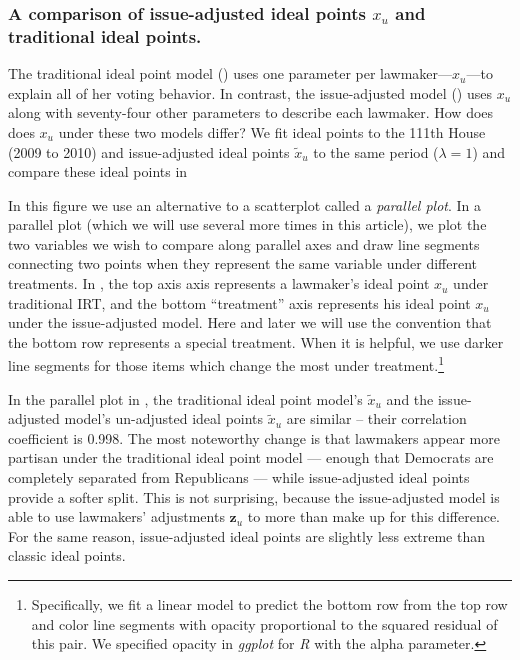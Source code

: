 \subsubsection{A comparison of issue-adjusted ideal points $x_u$ and traditional ideal points.}
The traditional ideal point model () uses one parameter
per lawmaker---$x_u$---to explain all of her voting behavior.  In
contrast, the issue-adjusted model () uses
$x_u$ along with seventy-four other parameters to describe each
lawmaker.  How does does $x_u$ under these two models differ?  We fit
ideal points to the 111th House (2009 to 2010) and issue-adjusted
ideal points $\tilde x_u$ to the same period ($\lambda=1$) and compare
these ideal points in 

In this figure we use an alternative to a scatterplot called a
\emph{parallel plot}.  In a parallel plot (which we will use several
more times in this article), we plot the two variables we wish to
compare along parallel axes and draw line segments connecting two
points when they represent the same variable under different
treatments.  In , the top axis axis
represents a lawmaker's ideal point $x_u$ under traditional IRT, and
the bottom ``treatment'' axis represents his ideal point $x_u$ under
the issue-adjusted model.  Here and later we will use the convention
that the bottom row represents a special treatment. When it is
helpful, we use darker line segments for those items which change
the most under treatment.\footnote{Specifically, we fit a linear model
  to predict the bottom row from the top row and color line segments
  with opacity proportional to the squared residual of this pair. We
  specified opacity in \emph{ggplot} for \emph{R} with the alpha
  parameter.}

In the parallel plot in , the traditional
ideal point model's $\tilde x_u$ and the issue-adjusted model's un-adjusted ideal
points $\tilde x_u$ are similar -- their correlation coefficient is
0.998. The most noteworthy change is that lawmakers appear more
partisan under the traditional ideal point model --- enough that
Democrats are completely separated from Republicans --- while
issue-adjusted ideal points provide a softer split.  This is not
surprising, because the issue-adjusted model is able to use lawmakers'
adjustments $\bm z_u$ to more than make up for this difference.  For
the same reason, issue-adjusted ideal points are slightly less extreme
than classic ideal points.

